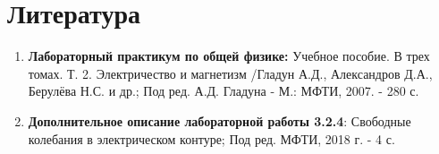 \documentclass[a4paper, 12pt]{article}%
\begin{document}
\section{Литература}
\begin{enumerate}
\item \textbf{Лабораторный практикум по общей физике:} Учебное пособие. В трех томах. Т. 2. Электричество и магнетизм /Гладун А.Д., Александров Д.А., Берулёва Н.С. и др.; Под ред. А.Д. Гладуна - М.: МФТИ, 2007. - 280 с.
\item \textbf{Дополнительное описание лабораторной работы 3.2.4}: Свободные колебания в электрическом контуре; Под ред. МФТИ, 2018 г. - 4 с.
\end{enumerate}

					
\end{document}
